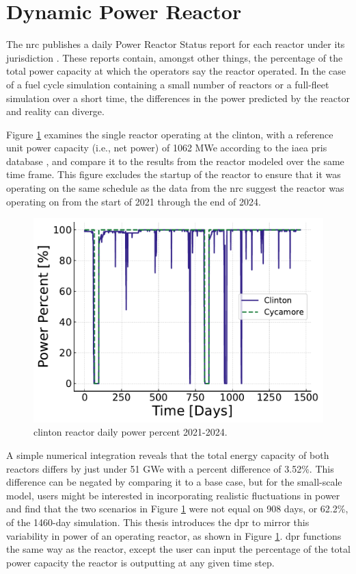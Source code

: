 \section{Dynamic Power Reactor}
\label{sec:dpr_method}

The \gls{nrc} publishes a daily Power Reactor Status report for each reactor
under its jurisdiction \cite{nrc_power_2025}. These reports contain, amongst
other things, the percentage of the total power capacity at which the operators
say the reactor operated. In the case of a fuel cycle simulation containing a
small number of reactors or a full-fleet simulation over a short time, the
differences in the power predicted by the \cycamore reactor and reality can
diverge.

Figure \ref{fig:pp_full} examines the single reactor operating at the
\gls{clinton}, with a reference unit power capacity (i.e., net power) of 1062
MWe according to the \gls{iaea} \gls{pris} database \cite{IAEA_PRIS}, and
compare it to the results from the \cycamore reactor modeled over the same time
frame. This figure excludes the startup of the \cycamore reactor to ensure that it was operating on the same schedule as the data from the \gls{nrc} suggest the reactor was operating on from the start of 2021 through the end of 2024.

\begin{figure}[H]
  \centering
  \includegraphics[width=0.7\linewidth]{images/power_reactor/power_percent_clinton_fake.pdf}
  \caption{\gls{clinton} reactor daily power percent 2021-2024.}
  \label{fig:pp_full}
\end{figure}

A simple numerical integration reveals that the total energy capacity of both reactors differs by just under 51 GWe with a percent difference of 3.52\%. This difference can be negated by comparing it to a base case, but for the small-scale model, users might be interested in incorporating realistic fluctuations in power and find that the two scenarios in Figure \ref{fig:pp_full} were not equal on 908 days, or 62.2\%, of the 1460-day simulation. This thesis introduces the \gls{dpr} to mirror this variability in power of an operating reactor, as shown in Figure \ref{fig:pp_full}. \gls{dpr} functions the same way as the \cycamore reactor, except the user can input the percentage of the total power capacity the reactor is outputting at any given time step.


